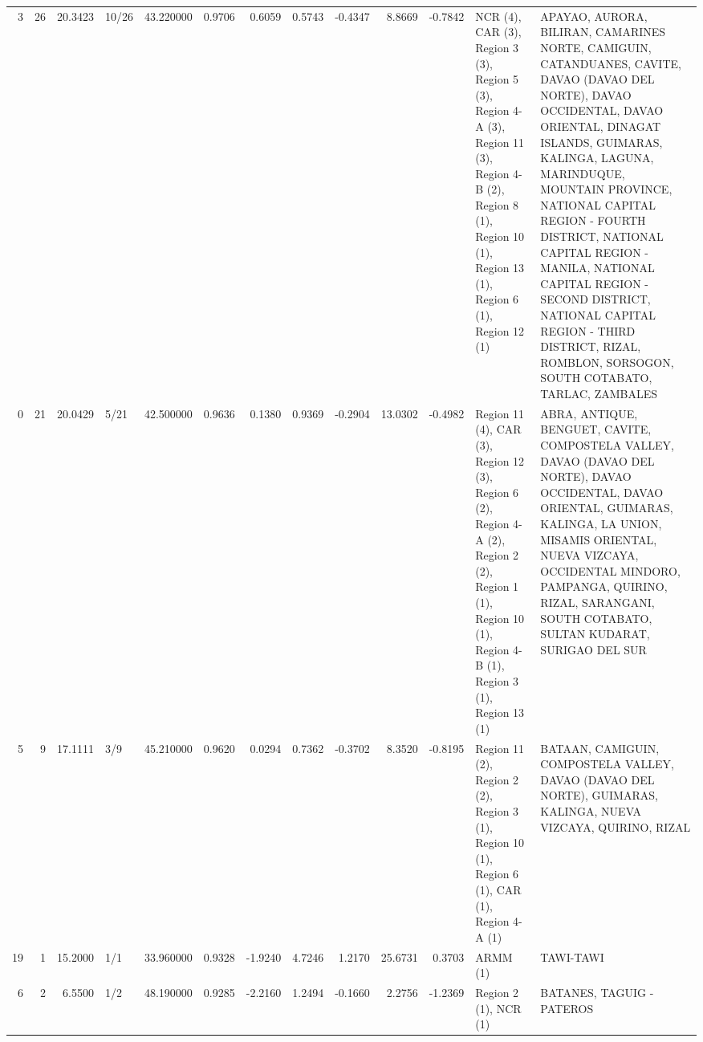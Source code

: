 \begin{tabular}{rrrlrrrrrrrll}
3 & 26 & {\cellcolor[HTML]{89ACFD}} \color[HTML]{000000} 20.3423 & 10/26 & {\cellcolor[HTML]{F5C1A9}} \color[HTML]{000000} 43.220000 & 0.9706 & 0.6059 & 0.5743 & -0.4347 & 8.8669 & -0.7842 & NCR (4), CAR (3), Region 3 (3), Region 5 (3), Region 4-A (3), Region 11 (3), Region 4-B (2), Region 8 (1), Region 10 (1), Region 13 (1), Region 6 (1), Region 12 (1) & APAYAO, AURORA, BILIRAN, CAMARINES NORTE, CAMIGUIN, CATANDUANES, CAVITE, DAVAO (DAVAO DEL NORTE), DAVAO OCCIDENTAL, DAVAO ORIENTAL, DINAGAT ISLANDS, GUIMARAS, KALINGA, LAGUNA, MARINDUQUE, MOUNTAIN PROVINCE, NATIONAL CAPITAL REGION - FOURTH DISTRICT, NATIONAL CAPITAL REGION - MANILA, NATIONAL CAPITAL REGION - SECOND DISTRICT, NATIONAL CAPITAL REGION - THIRD DISTRICT, RIZAL, ROMBLON, SORSOGON, SOUTH COTABATO, TARLAC, ZAMBALES \\
0 & 21 & {\cellcolor[HTML]{88ABFD}} \color[HTML]{000000} 20.0429 & 5/21 & {\cellcolor[HTML]{F2CBB7}} \color[HTML]{000000} 42.500000 & 0.9636 & 0.1380 & 0.9369 & -0.2904 & 13.0302 & -0.4982 & Region 11 (4), CAR (3), Region 12 (3), Region 6 (2), Region 4-A (2), Region 2 (2), Region 1 (1), Region 10 (1), Region 4-B (1), Region 3 (1), Region 13 (1) & ABRA, ANTIQUE, BENGUET, CAVITE, COMPOSTELA VALLEY, DAVAO (DAVAO DEL NORTE), DAVAO OCCIDENTAL, DAVAO ORIENTAL, GUIMARAS, KALINGA, LA UNION, MISAMIS ORIENTAL, NUEVA VIZCAYA, OCCIDENTAL MINDORO, PAMPANGA, QUIRINO, RIZAL, SARANGANI, SOUTH COTABATO, SULTAN KUDARAT, SURIGAO DEL SUR \\
5 & 9 & {\cellcolor[HTML]{7699F6}} \color[HTML]{F1F1F1} 17.1111 & 3/9 & {\cellcolor[HTML]{F6A283}} \color[HTML]{000000} 45.210000 & 0.9620 & 0.0294 & 0.7362 & -0.3702 & 8.3520 & -0.8195 & Region 11 (2), Region 2 (2), Region 3 (1), Region 10 (1), Region 6 (1), CAR (1), Region 4-A (1) & BATAAN, CAMIGUIN, COMPOSTELA VALLEY, DAVAO (DAVAO DEL NORTE), GUIMARAS, KALINGA, NUEVA VIZCAYA, QUIRINO, RIZAL \\
19 & 1 & {\cellcolor[HTML]{6A8BEF}} \color[HTML]{F1F1F1} 15.2000 & 1/1 & {\cellcolor[HTML]{779AF7}} \color[HTML]{F1F1F1} 33.960000 & 0.9328 & -1.9240 & 4.7246 & 1.2170 & 25.6731 & 0.3703 & ARMM (1) & TAWI-TAWI \\
6 & 2 & {\cellcolor[HTML]{3B4CC0}} \color[HTML]{F1F1F1} 6.5500 & 1/2 & {\cellcolor[HTML]{DE614D}} \color[HTML]{F1F1F1} 48.190000 & 0.9285 & -2.2160 & 1.2494 & -0.1660 & 2.2756 & -1.2369 & Region 2 (1), NCR (1) & BATANES, TAGUIG - PATEROS \\
\bottomrule
\end{tabular}
